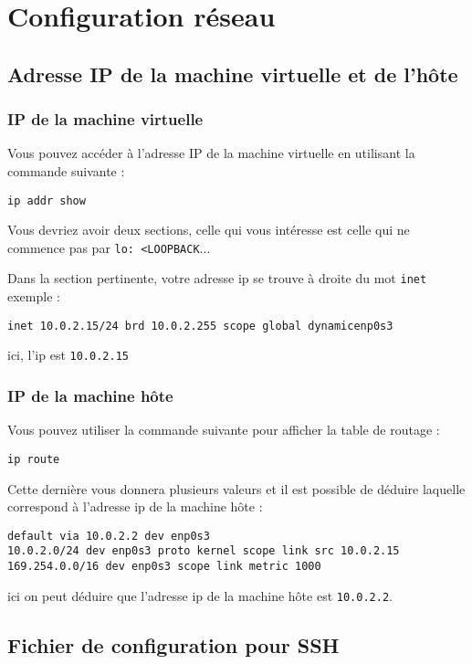 \chapter{Configuration réseau}

\section{Adresse IP de la machine virtuelle et de l'hôte}

\subsection{IP de la machine virtuelle}

Vous pouvez accéder à l'adresse IP de la machine virtuelle en utilisant la commande suivante :

\begin{lstlisting}
ip addr show
\end{lstlisting}

Vous devriez avoir deux sections, celle qui vous intéresse est celle qui ne commence pas par \texttt{lo: <LOOPBACK}...

Dans la section pertinente, votre adresse ip se trouve à droite du mot \texttt{inet}\\

exemple : 
\begin{lstlisting}[style=tf]
inet 10.0.2.15/24 brd 10.0.2.255 scope global dynamicenp0s3
\end{lstlisting}
ici, l'ip est \texttt{10.0.2.15}

\subsection{IP de la machine hôte}
Vous pouvez utiliser la commande suivante pour afficher la table de routage :
\begin{lstlisting}
ip route
\end{lstlisting}
Cette dernière vous donnera plusieurs valeurs et il est possible de déduire laquelle correspond à l'adresse ip de la machine hôte :
\begin{lstlisting}[style=tf]
default via 10.0.2.2 dev enp0s3
10.0.2.0/24 dev enp0s3 proto kernel scope link src 10.0.2.15
169.254.0.0/16 dev enp0s3 scope link metric 1000
\end{lstlisting}
ici on peut déduire que l'adresse ip de la machine hôte est \texttt{10.0.2.2}.\\

\section{Fichier de configuration pour SSH}

